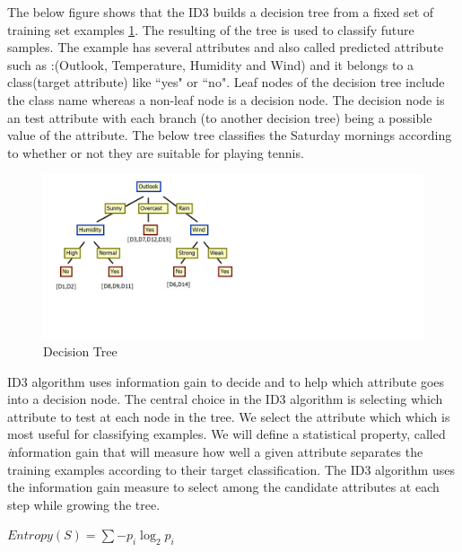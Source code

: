 \documentclass{report}
\begin{document}
The below figure shows that the ID3 builds a decision tree from a fixed set of training set examples \ref{fig:decisiontree}. The resulting of the tree is used to classify future samples. The example has several attributes and also called predicted attribute such as :(Outlook, Temperature, Humidity and Wind) and it belongs to a class(target attribute) like ``yes" or ``no". Leaf nodes of the decision tree include the class name whereas a non-leaf node is a decision node. The decision node is an test attribute with each branch (to another decision tree) being a possible value of the attribute. The below tree classifies the Saturday mornings according to whether or not they are suitable for playing tennis.





\begin{figure}[h]
\centering
\includegraphics[bb=0 0 1360 588,scale=0.5,keepaspectratio=true]{DecisionTree.jpg}
\caption{Decision Tree}
\label{fig:decisiontree}
\end{figure}


ID3 algorithm uses information gain to decide and to help which attribute goes into a decision node. The central choice in the ID3 algorithm is selecting which attribute to test at each node in the tree. We select the attribute which which is most useful for classifying examples. 
We will define a statistical property, called {\emph information gain } that will measure how well a given attribute separates the training examples according to their target classification.  The ID3 algorithm uses the information gain measure to select among the candidate attributes at each step while growing the tree.
%

{\centering
 $\mathit{Entropy}(S)=\sum -p_i\log _{2}p_i$ 
\par}
\end{document}
